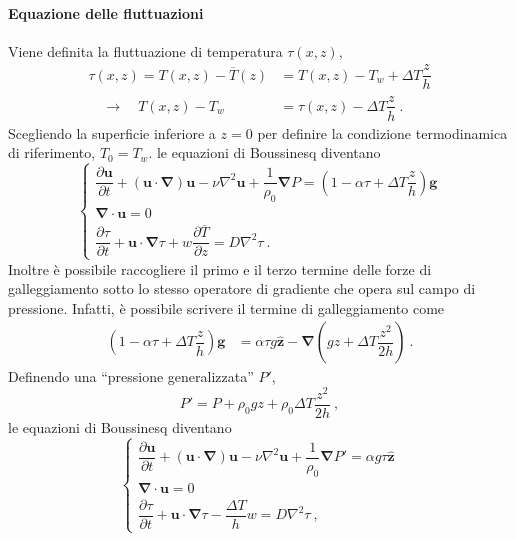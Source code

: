 \paragraph{Equazione delle fluttuazioni}
Viene definita la fluttuazione di temperatura $\tau(x,z)$,
\begin{equation}
\begin{aligned}
    \tau(x,z) = T(x,z) - \overline{T}(z) & = T(x,z) - T_w + \Delta T \dfrac{z}{h} \\
    \quad \rightarrow \quad T(x,z) - T_w & = \tau(x,z) - \Delta T \dfrac{z}{h} \ .
\end{aligned}
\end{equation}
Scegliendo la superficie inferiore a $z = 0$ per definire la condizione termodinamica di riferimento, $T_0 = T_w$.
le equazioni di Boussinesq diventano
\begin{equation}
    \begin{cases}
      \dfrac{\partial \bm{u}}{\partial t} + 
      \left( \bm{u} \cdot \bm{\nabla} \right) \bm{u} -
      \nu \nabla^2 \bm{u} + \dfrac{1}{\rho_0}\bm{\nabla} P = \left( 1 - \alpha \tau + \Delta T \dfrac{z}{h} \right) \bm{g} \\
      \bm{\nabla} \cdot \bm{u} = 0 \\
      \dfrac{\partial \tau}{\partial t} + \bm{u} \cdot 
      \bm{\nabla} \tau + w \dfrac{\partial \overline{T}}{\partial z}=  D \nabla^2 \tau \ .
    \end{cases}
\end{equation}
Inoltre è possibile raccogliere il primo e il terzo termine delle forze di galleggiamento sotto lo stesso operatore di gradiente che opera sul campo di pressione. Infatti, è possibile scrivere il termine di galleggiamento come
\begin{equation}
\begin{aligned}
    \left( 1 - \alpha \tau + \Delta T \dfrac{z}{h} \right) \bm{g} & = \alpha \tau g \bm{\hat{z}} - \bm{\nabla} \left( gz + \Delta T \dfrac{z^2}{2 h} \right) \ .
\end{aligned}
\end{equation}
Definendo una ``pressione generalizzata'' $P'$,
\begin{equation}
    P' = P + \rho_0 g z + \rho_0 \Delta T \dfrac{z^2}{2 h} \ ,
\end{equation}
le equazioni di Boussinesq diventano
\begin{equation}\label{eqn:Bouss-tau}
    \begin{cases}
      \dfrac{\partial \bm{u}}{\partial t} + 
      \left( \bm{u} \cdot \bm{\nabla} \right) \bm{u} -
      \nu \nabla^2 \bm{u} + \dfrac{1}{\rho_0}\bm{\nabla} P' = \alpha  g \tau \bm{\hat{z}} \\
      \bm{\nabla} \cdot \bm{u} = 0 \\
      \dfrac{\partial \tau}{\partial t} + \bm{u} \cdot 
      \bm{\nabla} \tau -\dfrac{\Delta T}{h} w =  D \nabla^2 \tau \ ,
    \end{cases}
\end{equation}
